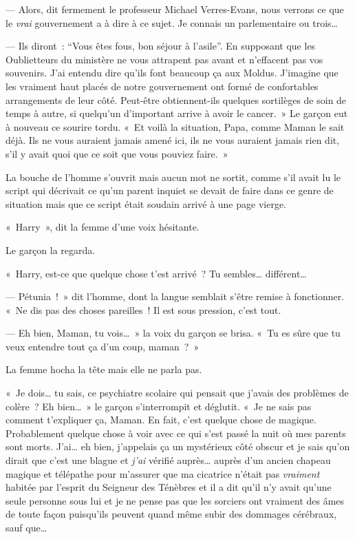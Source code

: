 --- Alors, dit fermement le professeur Michael Verres-Evans, nous verrons ce que le \emph{vrai} gouvernement a à dire à ce sujet. Je connais un parlementaire ou trois…

--- Ils diront~: “Vous êtes fous, bon séjour à l'asile”. En supposant que les Oublietteurs du ministère ne vous attrapent pas avant et n'effacent pas vos souvenirs. J'ai entendu dire qu'ils font beaucoup ça aux Moldus. J'imagine que les vraiment haut placés de notre gouvernement ont formé de confortables arrangements de leur côté. Peut-être obtiennent-ils quelques sortilèges de soin de temps à autre, si quelqu'un d'important arrive à avoir le cancer.~» Le garçon eut à nouveau ce sourire tordu. «~Et voilà la situation, Papa, comme Maman le sait déjà. Ils ne vous auraient jamais amené ici, ils ne vous auraient jamais rien dit, s'il y avait quoi que ce soit que vous pouviez faire.~»

La bouche de l'homme s'ouvrit mais aucun mot ne sortit, comme s'il avait lu le script qui décrivait ce qu'un parent inquiet se devait de faire dans ce genre de situation mais que ce script était soudain arrivé à une page vierge.

«~Harry~», dit la femme d'une voix hésitante.

Le garçon la regarda.

«~Harry, est-ce que quelque chose t'est arrivé~? Tu sembles… différent…

--- Pétunia~!~» dit l'homme, dont la langue semblait s'être remise à fonctionner. «~Ne dis pas des choses pareilles~! Il est sous pression, c'est tout.

--- Eh bien, Maman, tu vois…~» la voix du garçon se brisa. «~Tu es sûre que tu veux entendre tout ça d'un coup, maman~?~»

La femme hocha la tête mais elle ne parla pas.

«~Je dois… tu sais, ce psychiatre scolaire qui pensait que j'avais des problèmes de colère~? Eh bien…~» le garçon s'interrompit et déglutit. «~Je ne sais pas comment t'expliquer ça, Maman. En fait, c'est quelque chose de magique. Probablement quelque chose à voir avec ce qui s'est passé la nuit où mes parents sont morts. J'ai… eh bien, j'appelais ça un mystérieux côté obscur et je sais qu'on dirait que c'est une blague et \emph{j'ai} vérifié auprès… auprès d'un ancien chapeau magique et télépathe pour m'assurer que ma cicatrice n'était pas \emph{vraiment} habitée par l'esprit du Seigneur des Ténèbres et il a dit qu'il n'y avait qu'une seule personne sous lui et je ne pense pas que les sorciers ont vraiment des âmes de toute façon puisqu'ils peuvent quand même subir des dommages cérébraux, sauf que…

